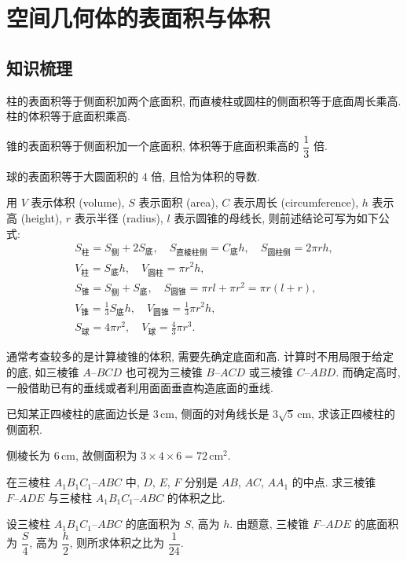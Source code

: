 
\section{空间几何体的表面积与体积}

\subsection{知识梳理}

柱的表面积等于侧面积加两个底面积, 而直棱柱或圆柱的侧面积等于底面周长乘高. 柱的体积等于底面积乘高.

锥的表面积等于侧面积加一个底面积, 体积等于底面积乘高的  $\dfrac13$ 倍.

球的表面积等于大圆面积的 4 倍, 且恰为体积的导数.

用 $V$ 表示体积 (volume), $S$ 表示面积 (area), $C$ 表示周长 (circumference), $h$ 表示高 (height), $r$ 表示半径 (radius), $l$ 表示圆锥的母线长, 则前述结论可写为如下公式:
\[\begin{gathered}
    S_{\text{柱}}= S_{\text{侧}}+2S_{\text{底}},\quad
    S_{\text{直棱柱侧}}= C_{\text{底}}h,\quad
    S_{\text{圆柱侧}}= 2\pi rh,\\
    V_{\text{柱}}= S_{\text{底}}h,\quad
    V_{\text{圆柱}}= \pi r^2h,\\
    S_{\text{锥}}= S_{\text{侧}}+S_{\text{底}},\quad
    S_{\text{圆锥}}= \pi rl+\pi r^2= \pi r(l+r),\\
    V_{\text{锥}}= \frac13S_{\text{底}}h,\quad
    V_{\text{圆锥}}= \frac13\pi r^2h,\\
    S_{\text{球}}= 4\pi r^2,\quad
    V_{\text{球}}= \frac43\pi r^3.
\end{gathered}\]

通常考查较多的是计算棱锥的体积, 需要先确定底面和高. 计算时不用局限于给定的底, 如三棱锥 $A\text{--}BCD$ 也可视为三棱锥 $B\text{--}ACD$ 或三棱锥 $C\text{--}ABD$. 而确定高时, 一般借助已有的垂线或者利用面面垂直构造底面的垂线.

\lianxi
\begin{exercise}
    已知某正四棱柱的底面边长是 $3\,\text{cm}$, 侧面的对角线长是 $3\sqrt5\,\text{cm}$, 求该正四棱柱的侧面积.
\end{exercise}
\beginsolution
    侧棱长为 $6\,\text{cm}$, 故侧面积为 $3\times 4\times 6= 72\,\text{cm}^2$.
\endsolution

\begin{exercise}
    在三棱柱 $A_1 B_1 C_1 \text{--}ABC$ 中, $D$, $E$, $F$ 分别是 $AB$, $AC$, $AA_1$ 的中点. 求三棱锥 $F\text{--}ADE$ 与三棱柱 $A_1 B_1 C_1 \text{--}ABC$ 的体积之比.
\end{exercise}
\beginsolution
    设三棱柱 $A_1 B_1 C_1 \text{--}ABC$ 的底面积为 $S$, 高为 $h$. 由题意, 三棱锥 $F\text{--}ADE$ 的底面积为 $\dfrac{S}4$, 高为 $\dfrac{h}2$, 则所求体积之比为 $\dfrac1{24}$.
\endsolution
    
